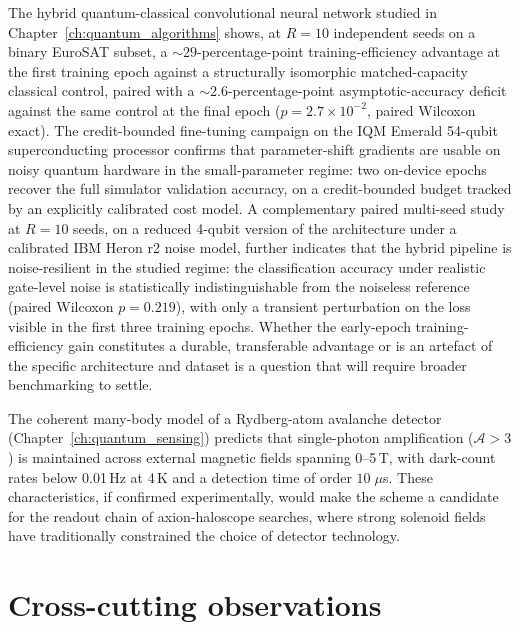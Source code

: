 The hybrid quantum-classical convolutional neural network studied in
Chapter~\ref{ch:quantum_algorithms} shows, at $R=10$ independent seeds
on a binary EuroSAT subset, a $\sim 29$-percentage-point
training-efficiency advantage at the first training epoch against a
structurally isomorphic matched-capacity classical control, paired with
a $\sim 2.6$-percentage-point asymptotic-accuracy deficit against the
same control at the final epoch ($p=2.7\times 10^{-2}$, paired Wilcoxon
exact). The credit-bounded fine-tuning campaign on the IQM Emerald
54-qubit superconducting processor confirms that parameter-shift
gradients are usable on noisy quantum hardware in the small-parameter
regime: two on-device epochs recover the full simulator validation
accuracy, on a credit-bounded budget tracked by an explicitly
calibrated cost model. A complementary paired multi-seed study at
$R=10$ seeds, on a reduced 4-qubit version of the architecture under
a calibrated IBM Heron r2 noise model, further indicates that the
hybrid pipeline is noise-resilient in the studied regime: the
classification accuracy under realistic gate-level noise is
statistically indistinguishable from the noiseless reference
(paired Wilcoxon $p=0.219$), with only a transient perturbation on
the loss visible in the first three training epochs. Whether the
early-epoch training-efficiency gain constitutes a durable,
transferable advantage or is an artefact of the specific
architecture and dataset is a question that will require broader
benchmarking to settle.

The coherent many-body model of a Rydberg-atom avalanche detector
(Chapter~\ref{ch:quantum_sensing}) predicts that single-photon
amplification ($\mathcal{A} > 3$) is maintained across external
magnetic fields spanning 0--5\,T, with dark-count rates below
0.01\,Hz at 4\,K and a detection time of order $10\;\mu$s.  These characteristics, if confirmed experimentally,
would make the scheme a candidate for the readout chain of
axion-haloscope searches, where strong solenoid fields have
traditionally constrained the choice of detector technology.

\section{Cross-cutting observations}

